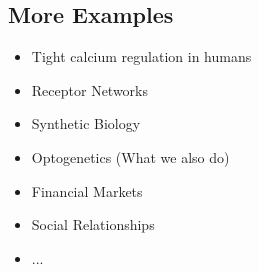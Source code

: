 \subsection{More Examples}
\label{subsec:more-examples}
\begin{frame}{\insertsubsection}

    \begin{itemize}[<+->]
        \item Tight calcium regulation in humans
        \item Receptor Networks
        \item Synthetic Biology
        \item Optogenetics (What we also do)
        \item Financial Markets
        \item Social Relationships
        \item ...
    \end{itemize}
\end{frame}
%
%
